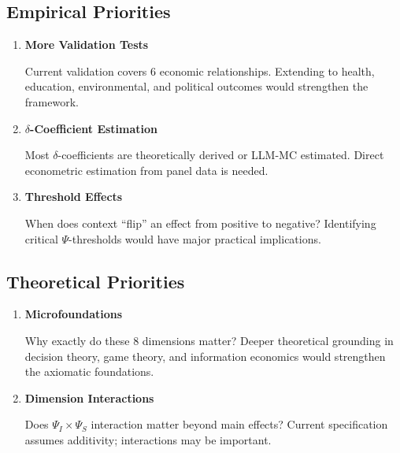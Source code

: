 \subsection{Empirical Priorities}

\begin{enumerate}
    \item \textbf{More Validation Tests}
    
    Current validation covers 6 economic relationships. Extending to health, 
    education, environmental, and political outcomes would strengthen the framework.
    
    \item \textbf{$\delta$-Coefficient Estimation}
    
    Most $\delta$-coefficients are theoretically derived or LLM-MC estimated. 
    Direct econometric estimation from panel data is needed.
    
    \item \textbf{Threshold Effects}
    
    When does context ``flip'' an effect from positive to negative? 
    Identifying critical $\Psi$-thresholds would have major practical implications.
\end{enumerate}

\subsection{Theoretical Priorities}

\begin{enumerate}
    \item \textbf{Microfoundations}
    
    Why exactly do these 8 dimensions matter? Deeper theoretical grounding 
    in decision theory, game theory, and information economics would strengthen 
    the axiomatic foundations.
    
    \item \textbf{Dimension Interactions}
    
    Does $\Psi_I \times \Psi_S$ interaction matter beyond main effects? 
    Current specification assumes additivity; interactions may be important.
\end{enumerate}




